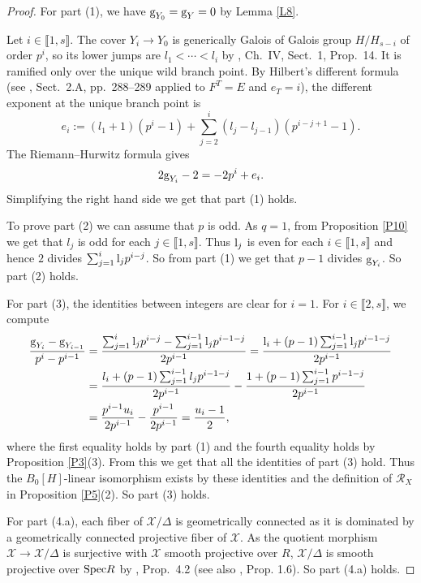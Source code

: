 \documentclass[11pt]{amsart}
\def\l{\textup{l}}
\def\Spec{\textup{Spec}}
\begin{document}
\begin{proof}
For part (1), we have $\textup{g}_{Y_0}=\textup{g}_Y=0$ by Lemma \ref{L8}. 

Let $i\in\llbracket1,s\rrbracket$. The cover $Y_i\rightarrow Y_0$ is generically Galois of Galois group $H/H_{s-i}$ of order $p^i$, so its lower jumps are $l_1<\cdots<l_i$ by \cite{S}, Ch.\ IV, Sect.\ 1, Prop.\ 14. It is ramified only over the unique wild branch point. By Hilbert's different formula (see \cite{P}, Sect.\ 2.A, pp.\ 288--289 applied to $F^T=E$ and $e_T=i$), the different exponent at the unique branch point is
\[
e_i:=(l_1+1)(p^i-1)+\sum_{j=2}^i(l_j-l_{j-1})(p^{i-j+1}-1).
\]
The Riemann--Hurwitz formula gives
\[
2\textup{g}_{Y_i}-2=-2p^i+e_i.
\]
Simplifying the right hand side we get that part (1) holds. 

To prove part (2) we can assume that $p$ is odd. As $q=1$, from Proposition \ref{P10} we get that $l_j$ is odd for each $j\in\llbracket1,s\rrbracket$. Thus $\l_j$ is even for each $i\in\llbracket1,s\rrbracket$ and hence $2$ divides $\sum_{j=1}^i \l_jp^{i-j}$. So from part (1) we get that $p-1$ divides $\textup{g}_{Y_i}$. So part (2) holds.

For part (3), the identities between integers are clear for $i=1$. For $i\in\llbracket 2,s\rrbracket$, we compute
\begin{align*}
\frac{\textup{g}_{Y_i}-\textup{g}_{Y_{i-1}}}{p^i-p^{i-1}}&=\frac{\sum_{j=1}^i \l_jp^{i-j}-\sum_{j=1}^{i-1} \l_jp^{i-1-j}}{2p^{i-1}}=\frac{\l_i+(p-1)\sum_{j=1}^{i-1}\l_jp^{i-1-j}}{2p^{i-1}}\\
&=\frac{l_i+(p-1)\sum_{j=1}^{i-1}l_jp^{i-1-j}}{2p^{i-1}}-\frac{1+(p-1)\sum_{j=1}^{i-1}p^{i-1-j}}{2p^{i-1}}\\
&=\frac{p^{i-1}u_i}{2p^{i-1}}-\frac{p^{i-1}}{2p^{i-1}}=\frac{u_i-1}{2},
\end{align*}
where the first equality holds by part (1) and the fourth equality holds by Proposition \ref{P3}(3). From this we get that all the identities of part (3) hold. Thus the $B_0[H]$-linear isomorphism exists by these identities and the definition of $\mathcal R_X$ in Proposition \ref{P5}(2). So part (3) holds.

For part (4.a), each fiber of $\mathcal X/\Delta$ is geometrically connected as it is dominated by a geometrically connected projective fiber of $\mathcal X$. As the quotient morphism $\mathcal X\rightarrow\mathcal X/\Delta$ is surjective with $\mathcal X$ smooth projective over $R$, $\mathcal X/\Delta$ is smooth projective over $\Spec R$ by \cite{dJ}, Prop.\ 4.2 (see also \cite{LL}, Prop. 1.6). So part (4.a) holds.


\end{proof}
\end{document}
